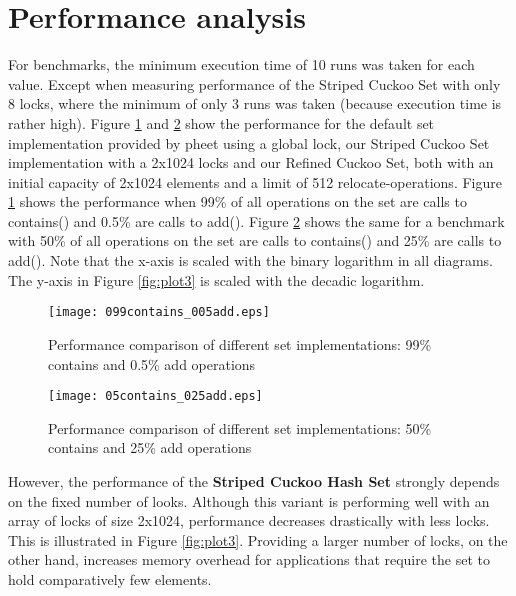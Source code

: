 \documentclass[a4paper,10pt]{article}
\begin{document}
\section{Performance analysis}
\label{sec:performance}
For benchmarks, the minimum execution time of 10 runs was taken for each value. Except when measuring performance of the Striped Cuckoo Set with only 8 locks, where the minimum of only 3 runs was taken (because execution time is rather high).
\medskip
\newline
Figure \ref{fig:plot1} and \ref{fig:plot2} show the performance for the default set implementation provided by pheet using a global lock, our Striped Cuckoo Set implementation with a 2x1024 locks and our Refined Cuckoo Set, both with an initial capacity of 2x1024 elements and a limit of 512 relocate-operations. Figure \ref{fig:plot1} shows the performance when 99\% of all operations on the set are calls to contains() and 0.5\% are calls to add(). Figure \ref{fig:plot2} shows the same for a benchmark with 50\% of all operations on the set are calls to contains() and 25\% are calls to add().
\newline
Note that the x-axis is scaled with the binary logarithm in all diagrams. The y-axis in Figure \ref{fig:plot3} is scaled with the decadic logarithm.

\begin{figure}[H]
\begin{center}
\texttt{[image: 099contains\_005add.eps]}
\end{center}
\caption{Performance comparison of different set implementations: 99\% contains and 0.5\% add operations}
\label{fig:plot1}
\end{figure}

\begin{figure}[H]
\begin{center}
\texttt{[image: 05contains\_025add.eps]}
\end{center}
\caption{Performance comparison of different set implementations: 50\% contains and 25\% add operations}
\label{fig:plot2}
\end{figure}

However, the performance of the \textbf{Striped Cuckoo Hash Set} strongly depends on the fixed number of looks. Although this variant is performing well with an array of locks of size 2x1024, performance decreases drastically with less locks. This is illustrated in Figure \ref{fig:plot3}. Providing a larger number of locks, on the other hand, increases memory overhead for applications that require the set to hold comparatively few elements.
\end{document}
